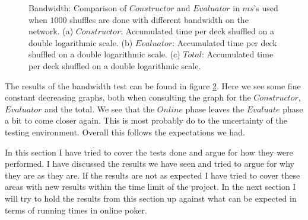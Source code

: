 \documentclass[twoside,11pt,openright]{report}
\begin{document}
\begin{figure}
    \begin{subfigure}{\textwidth}
        \centering
        \caption{}
        \label{fig:total_bandwith_plot}
    \end{subfigure}
    \caption{Bandwidth: Comparison of $Constructor$ and $Evaluator$ in $ms$'s used when $1000$ shuffles are done with different bandwidth on the network. (a) $Constructor$: Accumulated time per deck shuffled on a double logarithmic scale. (b) $Evaluator$: Accumulated time per deck shuffled on a double logarithmic scale. (c) $Total$: Accumulated time per deck shuffled on a double logarithmic scale.}
    \label{fig:mesurement_bandwith}
\end{figure}

The results of the bandwidth test can be found in figure \ref{fig:mesurement_bandwith}. Here we see some fine constant decreasing graphs, both when consulting the graph for the $Constructor$, $Evaluator$ and the total. We see that the $Online$ phase leaves the $Evaluate$ phase a bit to come closer again. This is most probably do to the uncertainty of the testing environment. Overall this follows the expectations we had.

\bigskip

In this section I have tried to cover the tests done and argue for how they were performed. I have discussed the results we have seen and tried to argue for why they are as they are. If the results are not as expected I have tried to cover these areas with new results within the time limit of the project. In the next section I will try to hold the results from this section up against what can be expected in terms of running times in online poker.
\end{document}
